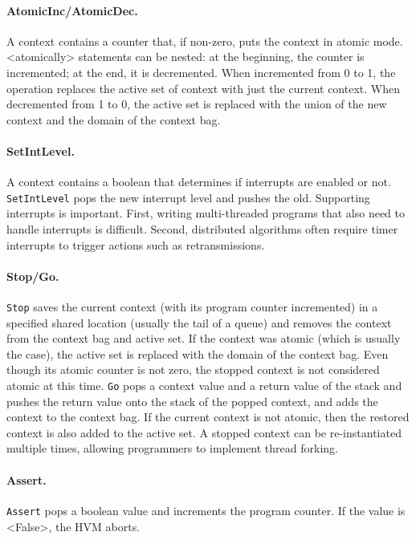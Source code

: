 \documentclass[twocolumn]{article}
\begin{document}
\paragraph{AtomicInc/AtomicDec.}  A context contains a counter that,
if non-zero, puts the context in atomic mode.
<{atomically}> statements can be nested: at the beginning, the
counter is incremented; at the end, it is decremented.
When incremented from 0 to 1, the operation replaces the active
set of context with just the current context.  When decremented
from 1 to 0, the active set is replaced with the union of the
new context and the domain of the context bag.

\paragraph{SetIntLevel.}  A context contains a boolean that determines
if interrupts are enabled or not.  \texttt{SetIntLevel} pops the
new interrupt level and pushes the old.  Supporting interrupts is
important.  First, writing multi-threaded programs that also need
to handle interrupts is difficult.  Second, distributed algorithms
often require timer interrupts to trigger actions such as retransmissions.

\paragraph{Stop/Go.}  \texttt{Stop} saves the current context (with
its program counter incremented) in a specified shared location (usually the
tail of a queue) and removes the context from the context bag and active set.
If the context was atomic (which is usually the case), the active set is
replaced with the domain of the context bag.  Even though its atomic counter
is not zero, the stopped context is not considered atomic at this time.
\texttt{Go} pops a context value and a return value of the stack and
pushes the return value onto the stack of the popped context, and adds
the context to the context bag.  If the current context is not atomic,
then the restored context is also added to the active set.
A stopped context can be re-instantiated multiple times, allowing
programmers to implement thread forking.

\paragraph{Assert.}  \texttt{Assert} pops a boolean value and increments
the program counter.  If the value is <{False}>, the HVM aborts.
\end{document}
